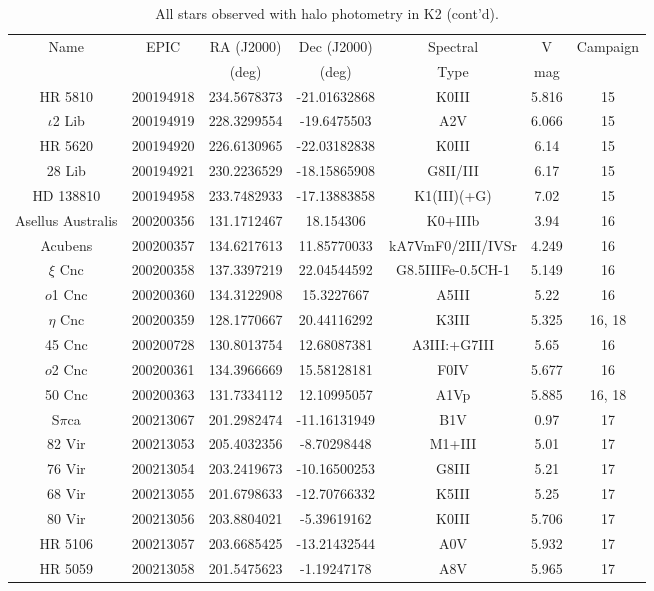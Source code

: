 \begin{table*}
\caption{All stars observed with halo photometry in K2 (cont'd).}
\begin{tabular}{ccccccc}
\hline \hline
Name & EPIC & RA (J2000) & Dec (J2000) & Spectral & V & Campaign \\
 &  & (deg) & (deg) & Type & mag &  \\
\hline
HR 5810 & 200194918 & 234.5678373 & -21.01632868 & K0III & 5.816 & 15 \\
$\iota$2 Lib & 200194919 & 228.3299554 & -19.6475503 & A2V & 6.066 & 15 \\
HR 5620 & 200194920 & 226.6130965 & -22.03182838 & K0III & 6.14 & 15 \\
28 Lib & 200194921 & 230.2236529 & -18.15865908 & G8II/III & 6.17 & 15 \\
HD 138810 & 200194958 & 233.7482933 & -17.13883858 & K1(III)(+G) & 7.02 & 15 \\
Asellus Australis & 200200356 & 131.1712467 & 18.154306 & K0+IIIb & 3.94 & 16 \\
Acubens & 200200357 & 134.6217613 & 11.85770033 & kA7VmF0/2III/IVSr & 4.249 & 16 \\
$\xi$ Cnc & 200200358 & 137.3397219 & 22.04544592 & G8.5IIIFe-0.5CH-1 & 5.149 & 16 \\
$o$1 Cnc & 200200360 & 134.3122908 & 15.3227667 & A5III & 5.22 & 16 \\
$\eta$ Cnc & 200200359 & 128.1770667 & 20.44116292 & K3III & 5.325 & 16, 18 \\
45 Cnc & 200200728 & 130.8013754 & 12.68087381 & A3III:+G7III & 5.65 & 16 \\
$o$2 Cnc & 200200361 & 134.3966669 & 15.58128181 & F0IV & 5.677 & 16 \\
50 Cnc & 200200363 & 131.7334112 & 12.10995057 & A1Vp & 5.885 & 16, 18 \\
S$\pi$ca & 200213067 & 201.2982474 & -11.16131949 & B1V & 0.97 & 17 \\
82 Vir & 200213053 & 205.4032356 & -8.70298448 & M1+III & 5.01 & 17 \\
76 Vir & 200213054 & 203.2419673 & -10.16500253 & G8III & 5.21 & 17 \\
68 Vir & 200213055 & 201.6798633 & -12.70766332 & K5III & 5.25 & 17 \\
80 Vir & 200213056 & 203.8804021 & -5.39619162 & K0III & 5.706 & 17 \\
HR 5106 & 200213057 & 203.6685425 & -13.21432544 & A0V & 5.932 & 17 \\
HR 5059 & 200213058 & 201.5475623 & -1.19247178 & A8V & 5.965 & 17 \\

\end{tabular}
\end{table*}
